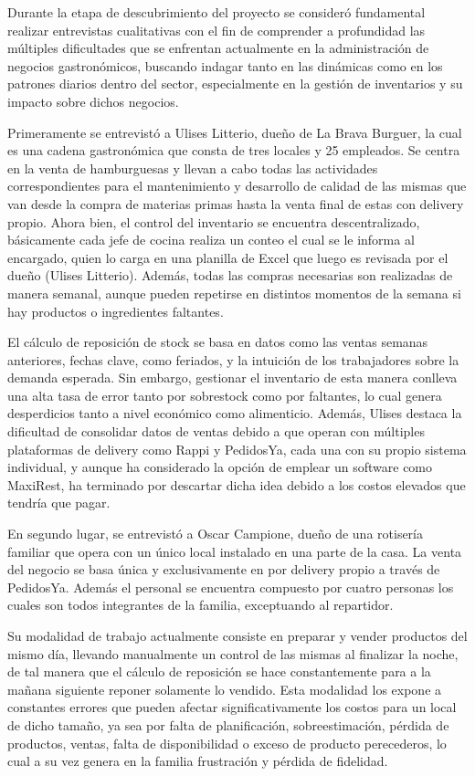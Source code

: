 Durante la etapa de descubrimiento del proyecto se consideró fundamental realizar entrevistas cualitativas con el fin de comprender a profundidad las múltiples dificultades que se enfrentan actualmente en la administración de negocios gastronómicos, buscando indagar tanto en las dinámicas como en los patrones diarios dentro del sector, especialmente en la gestión de inventarios y su impacto sobre dichos negocios.

Primeramente se entrevistó a Ulises Litterio, dueño de La Brava Burguer, la cual es una cadena gastronómica que consta de tres locales y 25 empleados. Se centra en la venta de hamburguesas y llevan a cabo todas las actividades correspondientes para el mantenimiento y desarrollo de calidad de las mismas que van desde la compra de materias primas hasta la venta final de estas con delivery propio. Ahora bien, el control del inventario se encuentra descentralizado, básicamente cada jefe de cocina realiza un conteo el cual se le informa al encargado, quien lo carga en una planilla de Excel que luego es revisada por el dueño (Ulises Litterio). Además, todas las compras necesarias son realizadas de manera semanal, aunque pueden repetirse en distintos momentos de la semana si hay productos o ingredientes faltantes.

El cálculo de reposición de stock se basa en datos como las ventas semanas anteriores, fechas clave, como feriados, y la intuición de los trabajadores sobre la demanda esperada. Sin embargo, gestionar el inventario de esta manera conlleva una alta tasa de error tanto por sobrestock como por faltantes, lo cual genera desperdicios tanto a nivel económico como alimenticio. Además, Ulises destaca la dificultad de consolidar datos de ventas debido a que operan con múltiples plataformas de delivery como Rappi y PedidosYa, cada una con su propio sistema individual, y aunque ha considerado la opción de emplear un software como MaxiRest, ha terminado por descartar dicha idea debido a los costos elevados que tendría que pagar.

En segundo lugar, se entrevistó a Oscar Campione, dueño de una rotisería familiar que opera con un único local instalado en una parte de la casa. La venta del negocio se basa única y exclusivamente en por delivery propio a través de PedidosYa. Además el personal se encuentra compuesto por cuatro personas los cuales son todos integrantes de la familia, exceptuando al repartidor.

Su modalidad de trabajo actualmente consiste en preparar y vender productos del mismo día, llevando manualmente un control de las mismas al finalizar la noche, de tal manera que el cálculo de reposición se hace constantemente para a la mañana siguiente reponer solamente lo vendido. Esta modalidad los expone a constantes errores que pueden afectar significativamente los costos para un local de dicho tamaño, ya sea por falta de planificación, sobreestimación, pérdida de productos, ventas, falta de disponibilidad o exceso de producto perecederos, lo cual a su vez genera en la familia frustración y pérdida de fidelidad.

